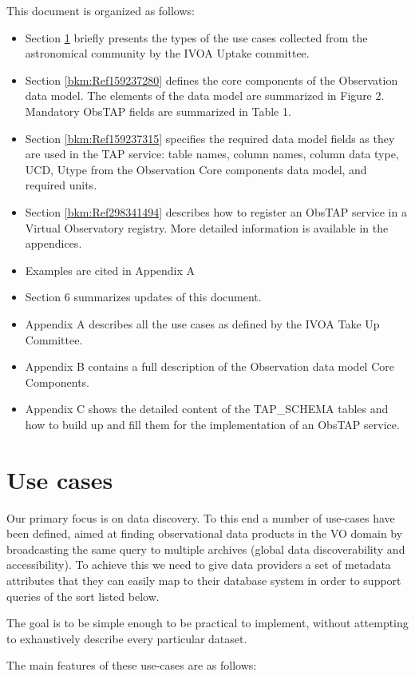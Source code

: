 \documentclass[11pt,a4paper]{ivoa}
\begin{document}
This document is organized as follows:
\begin{itemize}
\item Section \ref{bkm:Ref159237242} briefly presents the types of the use cases collected from the astronomical
community by the IVOA Uptake committee. 
\item Section \ref{bkm:Ref159237280} defines the core components of the Observation data model. The elements of the data
model are summarized in Figure 2. Mandatory ObsTAP fields are summarized in Table 1.
\item Section \ref{bkm:Ref159237315} specifies the required data model fields as they are used in the TAP service: table
names, column names, column data type, UCD, Utype from the Observation Core components data model, and required units. 
\item Section \ref{bkm:Ref298341494} describes how to register an ObsTAP service in a Virtual Observatory registry. 
More detailed information is available in the appendices.
\item Examples are cited in Appendix A
\item Section 6 summarizes updates of this document.
\item Appendix A describes all the use cases as defined by the IVOA Take Up Committee.
\item Appendix B contains a full description of the Observation data model Core Components.
\item Appendix C shows the detailed content of the TAP\_SCHEMA tables and how to build up and fill them for the
implementation of an ObsTAP service.
\end{itemize}
\section[Use cases]{Use cases}
\label{bkm:Ref159237242}Our primary focus is on data discovery.  To this end a number of use-cases have been defined,
aimed at finding observational data products in the VO domain by broadcasting the same query to multiple archives
(global data discoverability and accessibility).  To achieve this we need to give data providers a set of metadata
attributes that they can easily map to their database system in order to support queries of the sort listed below.

The goal is to be simple enough to be practical to implement, without attempting to exhaustively describe every
particular dataset.

The main features of these use-cases are as follows: 
\end{document}

